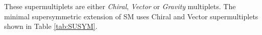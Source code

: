 
These supermultiplets are either \textit{Chiral}, \textit{Vector} or \textit{Gravity} multiplets. The minimal supersymmetric extension of SM uses Chiral and Vector supermultiplets shown in Table \ref{tab:SUSYM}.

